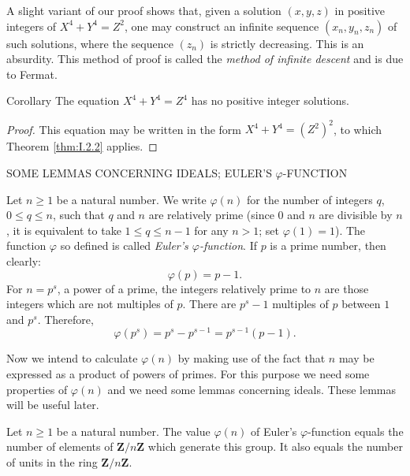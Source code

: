 A slight variant of our proof shows that, given a solution $(x,y,z)$ in
positive integers of $X^{4}+Y^{4}=Z^{2}$, one may construct an infinite
sequence $(x_{n},y_{n},z_{n})$ of such solutions, where the sequence
$(z_{n})$ is strictly decreasing. This is an absurdity. This method of proof
is called the \emph{method of infinite descent} and is due to Fermat.

\begin{statement}{Corollary}
The equation $X^{4}+Y^{4}=Z^{4}$ has no positive integer solutions.
\end{statement}

\begin{proof}
This equation may be written in the form $X^{4}+Y^{4}=(Z^{2})^{2}$, to which
Theorem \ref{thm:I.2.2} applies.
\end{proof}

%
        {SOME LEMMAS CONCERNING IDEALS; EULER'S $\varphi$-FUNCTION}

Let $n\geq1$ be a natural number. We write $\varphi(n)$ for the number of
integers $q$, $0\leq q\leq n$, such that $q$ and $n$ are relatively prime
(since $0$ and $n$ are divisible by $n$, it is equivalent to take
$1\leq q\leq n-1$ for any $n>1$; set $\varphi(1)=1$). The function $\varphi$
so defined is called \emph{Euler's $\varphi$-function}. If $p$ is a prime
number, then clearly:
\begin{equation}
\varphi(p)=p-1.
\label{eq:I.3.1}
\end{equation}
For $n=p^{s}$, a power of a prime, the integers relatively prime to $n$ are
those integers which are not multiples of $p$. There are $p^{s}-1$ multiples
of $p$ between $1$ and $p^{s}$. Therefore,
\begin{equation}
\varphi(p^{s})=p^{s}-p^{s-1}=p^{s-1}(p-1).
\label{eq:I.3.2}
\end{equation}

Now we intend to calculate $\varphi(n)$ by making use of the fact that $n$
may be expressed as a product of powers of primes. For this purpose we need
some properties of $\varphi(n)$ and we need some lemmas concerning ideals.
These lemmas will be useful later.

\begin{proposition}
\label{prop:I.3.1}
Let $n\geq1$ be a natural number. The value $\varphi(n)$ of Euler's
$\varphi$-function equals the number of elements of $\mathbf{Z}/n\mathbf{Z}$
which generate this group. It also equals the number of units in the ring
$\mathbf{Z}/n\mathbf{Z}$.
\end{proposition}

